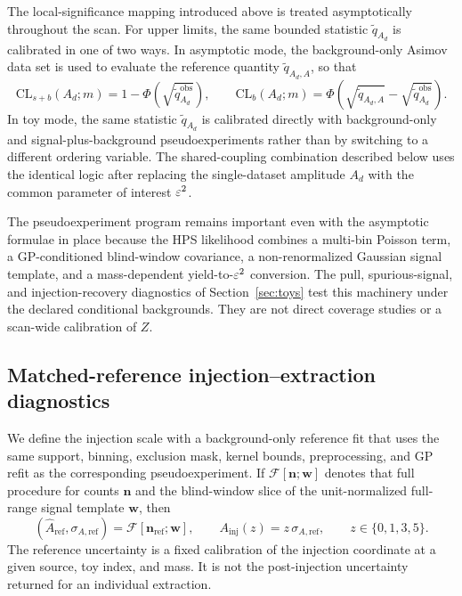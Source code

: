 The local-significance mapping introduced above is treated asymptotically throughout
the scan. For upper limits, the same bounded statistic
$\tilde q_{A_d}$ is calibrated in one of two ways. In asymptotic mode, the
background-only Asimov data set is used to evaluate the reference quantity
$\tilde q_{A_d,A}$, so that
\begin{equation}
\mathrm{CL}_{s+b}(A_d;m)
=
1-\Phi\!\left(\sqrt{\tilde q_{A_d}^{\mathrm{obs}}}\right),
\qquad
\mathrm{CL}_{b}(A_d;m)
=
\Phi\!\left(
\sqrt{\tilde q_{A_d,A}}-\sqrt{\tilde q_{A_d}^{\mathrm{obs}}}
\right).
\label{eq:cls-asymptotic}
\end{equation}
In toy mode, the same statistic $\tilde q_{A_d}$ is calibrated directly with
background-only and signal-plus-background pseudoexperiments rather than by switching
to a different ordering variable. The shared-coupling combination described below uses
the identical logic after replacing the single-dataset amplitude $A_d$ with the common
parameter of interest $\varepsilon^2$.

The pseudoexperiment program remains important even with the asymptotic formulae in
place because the HPS likelihood combines a multi-bin Poisson term, a GP-conditioned
blind-window covariance, a non-renormalized Gaussian signal template, and a
mass-dependent yield-to-$\varepsilon^2$ conversion. The pull, spurious-signal, and
injection-recovery diagnostics of Section~\ref{sec:toys} test this machinery under the
declared conditional backgrounds. They are not direct \CLs{} coverage studies or a
scan-wide calibration of $Z$.

\subsection{Matched-reference injection--extraction diagnostics}
\label{sec:matched-reference-diagnostics}

We define the injection scale with a background-only reference fit that uses the same
support, binning, exclusion mask, kernel bounds, preprocessing, and GP refit as the
corresponding pseudoexperiment. If
$\mathcal{F}[\bm n;\bm w]$ denotes that full procedure for counts $\bm n$ and the
blind-window slice of the unit-normalized full-range signal template $\bm w$, then
\begin{equation}
(\widehat A_{\mathrm{ref}},\sigma_{A,\mathrm{ref}})
=\mathcal{F}[\bm n_{\mathrm{ref}};\bm w],
\qquad
A_{\mathrm{inj}}(z)=z\,\sigma_{A,\mathrm{ref}},
\qquad z\in\{0,1,3,5\}.
\label{eq:v4p9-matched-reference-axis}
\end{equation}
The reference uncertainty is a fixed calibration of the injection coordinate at a
given source, toy index, and mass.  It is not the post-injection uncertainty returned
for an individual extraction.

